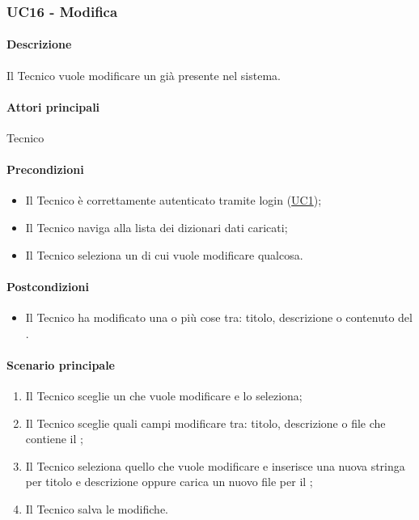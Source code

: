 \subsubsection{UC16 - Modifica }\label{UC16}
\paragraph*{Descrizione}
Il Tecnico vuole modificare un  già presente nel sistema.

\paragraph*{Attori principali}
Tecnico

\paragraph*{Precondizioni}
\begin{itemize}
  \item Il Tecnico è correttamente autenticato tramite login (\hyperref[UC1]{UC1});
  \item Il Tecnico naviga alla lista dei dizionari dati caricati;
  \item Il Tecnico seleziona un  di cui vuole modificare qualcosa.  
\end{itemize}

\paragraph*{Postcondizioni}
\begin{itemize}
  \item Il Tecnico ha modificato una o più cose tra: titolo, descrizione o contenuto del .
\end{itemize}

\paragraph*{Scenario principale}
\begin{enumerate}
  \item Il Tecnico sceglie un  che vuole modificare e lo seleziona;
  \item Il Tecnico sceglie quali campi modificare tra: titolo, descrizione o file che contiene il ;
  \item Il Tecnico seleziona quello che vuole modificare e inserisce una nuova stringa per titolo e descrizione oppure carica un nuovo file per il ;
  \item Il Tecnico salva le modifiche.  
\end{enumerate}

